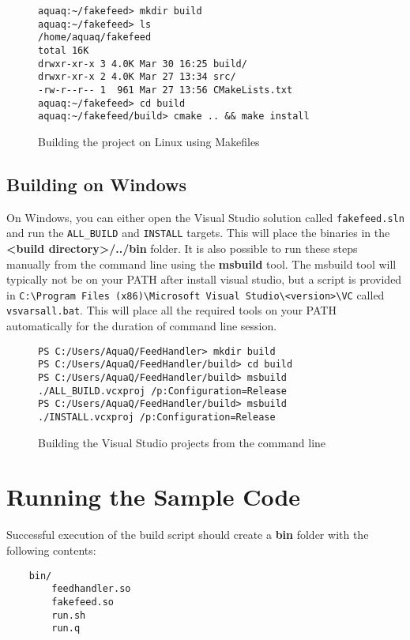 \begin{figure}
\begin{lstlisting}
aquaq:~/fakefeed> mkdir build
aquaq:~/fakefeed> ls
/home/aquaq/fakefeed
total 16K
drwxr-xr-x 3 4.0K Mar 30 16:25 build/
drwxr-xr-x 2 4.0K Mar 27 13:34 src/
-rw-r--r-- 1  961 Mar 27 13:56 CMakeLists.txt
aquaq:~/fakefeed> cd build
aquaq:~/fakefeed/build> cmake .. && make install
\end{lstlisting}
\caption{Building the project on Linux using Makefiles}
\end{figure}

\subsection{Building on Windows}

On Windows, you can either open the Visual Studio solution called \verb|fakefeed.sln| and run the \verb|ALL_BUILD| and \verb|INSTALL|
targets. This will place the binaries in the \textbf{<build directory>/../bin} folder. It is also possible to run these steps manually
from the command line using the \textbf{msbuild} tool. The msbuild tool will typically not be on your PATH after install visual studio,
but a script is provided in \verb|C:\Program Files (x86)\Microsoft Visual Studio\<version>\VC| called \verb|vsvarsall.bat|. This will
place all the required tools on your PATH automatically for the duration of command line session.

\begin{figure}
\begin{lstlisting}
PS C:/Users/AquaQ/FeedHandler> mkdir build
PS C:/Users/AquaQ/FeedHandler/build> cd build
PS C:/Users/AquaQ/FeedHandler/build> msbuild ./ALL_BUILD.vcxproj /p:Configuration=Release
PS C:/Users/AquaQ/FeedHandler/build> msbuild ./INSTALL.vcxproj /p:Configuration=Release
\end{lstlisting}
\caption{Building the Visual Studio projects from the command line}
\end{figure}

\section{Running the Sample Code}

Successful execution of the build script should create a \textbf{bin} folder with the following contents:

\begin{lstlisting}
	bin/
		feedhandler.so
		fakefeed.so
		run.sh
		run.q
\end{lstlisting}

